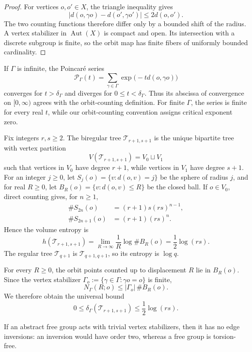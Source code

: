 \documentclass[11pt]{amsart}
\theoremstyle{plain}
\theoremstyle{definition}
\theoremstyle{remark}
\newcommand{\T}{\mathcal T}
\newcommand{\Aut}{\operatorname{Aut}}
\newcommand{\cP}{\mathcal P}
\begin{document}
\begin{proof}
For vertices \(o,o'\in X\), the triangle inequality gives
\[
  \bigl|d(o,\gamma o)-d(o',\gamma o')\bigr|
  \leq2d(o,o').
\]
The two counting functions therefore differ only by a bounded shift of the
radius.  A vertex stabilizer in \(\Aut(X)\) is compact and open.  Its
intersection with a discrete subgroup is finite, so the orbit map has finite
fibers of uniformly bounded cardinality.
\end{proof}

If \(\Gamma\) is infinite, the Poincar\'e series
\[
  \cP_\Gamma(t)
  =\sum_{\gamma\in\Gamma}\exp\!\bigl(-t d(o,\gamma o)\bigr)
\]
converges for \(t>\delta_\Gamma\) and diverges for
\(0\leq t<\delta_\Gamma\).  Thus its abscissa of convergence on
\([0,\infty)\) agrees with the orbit-counting definition.  For finite
\(\Gamma\), the series is finite for every real \(t\), while our
orbit-counting convention assigns critical exponent zero.

Fix integers \(r,s\geq2\).  The biregular tree \(\T_{r+1,s+1}\) is the
unique bipartite tree with vertex partition
\[
  V(\T_{r+1,s+1})=V_0\sqcup V_1
\]
such that vertices in \(V_0\) have degree \(r+1\), while vertices in \(V_1\)
have degree \(s+1\).  For an integer \(j\geq0\), let
\(S_j(o)=\{v:d(o,v)=j\}\) be the sphere of radius \(j\), and for real
\(R\geq0\), let \(B_R(o)=\{v:d(o,v)\leq R\}\) be the closed ball.  If
\(o\in V_0\), direct counting gives, for \(n\geq1\),
\begin{align*}
  \#S_{2n}(o)&=(r+1)s(rs)^{n-1},\\
  \#S_{2n+1}(o)&=(r+1)(rs)^n.
\end{align*}
Hence the volume entropy is
\begin{equation}\label{eq:biregular-entropy}
  h(\T_{r+1,s+1})
  =\lim_{R\to\infty}\frac1R\log\#B_R(o)
  =\frac12\log(rs).
\end{equation}
The regular tree \(\T_{q+1}\) is \(\T_{q+1,q+1}\), so its entropy is
\(\log q\).

For every \(R\geq0\), the orbit points counted up to displacement
\(R\) lie in \(B_R(o)\). Since the vertex stabilizer
\(\Gamma_o:=\{\gamma\in\Gamma:\gamma o=o\}\) is finite,
\[
  N_\Gamma(R;o)\leq |\Gamma_o|\,\#B_R(o).
\]
We therefore obtain the universal bound
\begin{equation}\label{eq:ambient-bound}
  0\leq\delta_\Gamma(\T_{r+1,s+1})
  \leq\frac12\log(rs).
\end{equation}

If an abstract free group acts with trivial vertex stabilizers, then it has
no edge inversions: an inversion would have order two, whereas a free group
is torsion-free.
\end{document}
